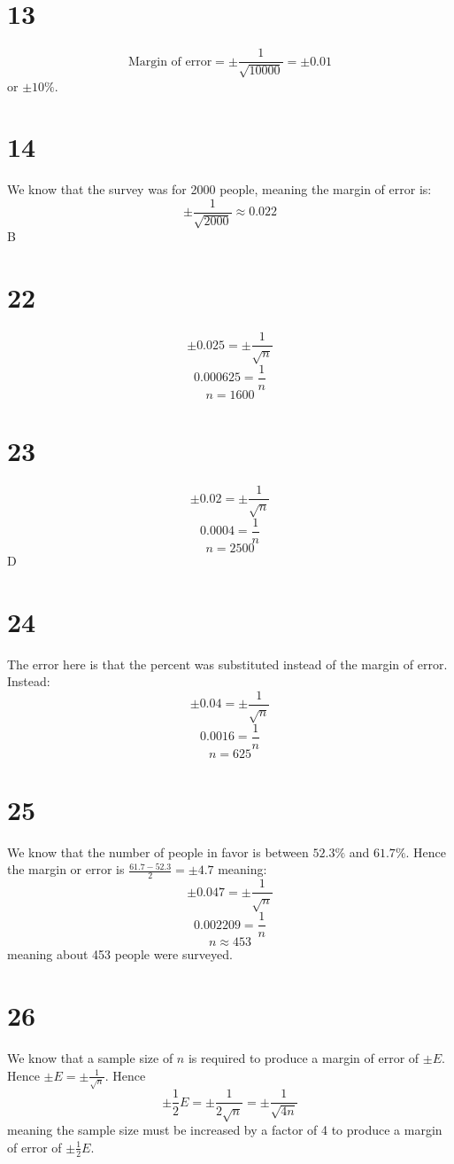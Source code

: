 \documentclass{article}
\theoremstyle{definition}
\newcommand{\?}{\stackrel{?}{=}}
\begin{document}
\section*{13}
\[ \textrm{Margin of error} =\pm\frac{1}{\sqrt{10000}}=\pm 0.01 \] or $\pm 10\%$.

\section*{14}
We know that the survey was for 2000 people, meaning the margin of error is:
\[ \pm\frac{1}{\sqrt{2000}}\approx 0.022 \] B

\section*{22}
\[ \pm 0.025=\pm\frac{1}{\sqrt{n}} \] \[ 0.000625=\frac{1}{n} \] \[ n=1600 \]

\section*{23}
\[ \pm 0.02=\pm\frac{1}{\sqrt{n}} \] \[ 0.0004=\frac{1}{n} \] \[ n=2500 \]
D

\section*{24}
The error here is that the percent was substituted instead of the margin of error. Instead:
\[ \pm 0.04=\pm\frac{1}{\sqrt{n}} \] \[ 0.0016=\frac{1}{n} \] \[ n=625 \]

\section*{25}
We know that the number of people in favor is between $52.3\%$ and $61.7\%$. Hence the margin or error is $\frac{61.7-52.3}{2}=\pm 4.7$ meaning:
\[ \pm 0.047=\pm\frac{1}{\sqrt{n}} \] \[ 0.002209=\frac{1}{n} \] \[ n\approx 453 \] meaning about 453 people were surveyed.

\section*{26}
We know that a sample size of $n$ is required to produce a margin of error of $\pm E$. Hence $\pm E=\pm\frac{1}{\sqrt{n}}$.
Hence \[ \pm\frac{1}{2}E=\pm\frac{1}{2\sqrt{n}}=\pm\frac{1}{\sqrt{4n}} \] meaning the sample size must be increased by a factor of 4 to produce a margin of error of 
$\pm\frac{1}{2}E$.
\end{document}
